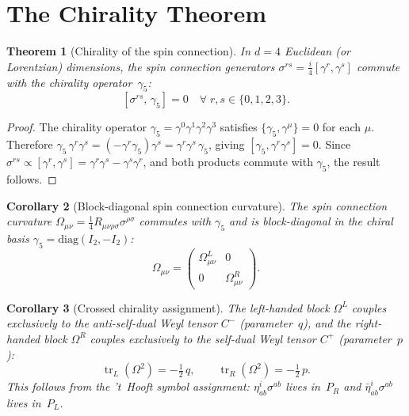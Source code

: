 \documentclass[12pt,a4paper]{article}
\newcommand{\tr}{\operatorname{tr}}
\newcommand{\half}{\tfrac{1}{2}}
\newtheorem{theorem}{Theorem}[section]
\newtheorem{corollary}[theorem]{Corollary}
\begin{document}
\section{The Chirality Theorem}
\label{sec:chirality}

\begin{theorem}[Chirality of the spin connection]
In $d = 4$ Euclidean (or Lorentzian) dimensions, the spin connection generators
$\sigma^{rs} = \frac{i}{4}[\gamma^r, \gamma^s]$ commute with the chirality
operator~$\gamma_5$:
\begin{equation}\label{eq:sigma-g5}
  [\sigma^{rs},\, \gamma_5] = 0 \quad \forall\; r, s \in \{0,1,2,3\}.
\end{equation}
\end{theorem}

\begin{proof}
The chirality operator $\gamma_5 = \gamma^0\gamma^1\gamma^2\gamma^3$ satisfies
$\{\gamma_5, \gamma^\mu\} = 0$ for each $\mu$.  Therefore
$\gamma_5\, \gamma^r\gamma^s = (-\gamma^r\gamma_5)\gamma^s
= \gamma^r\gamma^s\,\gamma_5$, giving
$[\gamma_5, \gamma^r\gamma^s] = 0$.  Since
$\sigma^{rs} \propto [\gamma^r, \gamma^s] = \gamma^r\gamma^s - \gamma^s\gamma^r$,
and both products commute with $\gamma_5$, the result follows.
\end{proof}

\begin{corollary}[Block-diagonal spin connection curvature]
The spin connection curvature
$\Omega_{\mu\nu} = \frac{1}{4}R_{\mu\nu\rho\sigma}\sigma^{\rho\sigma}$
commutes with $\gamma_5$ and is block-diagonal in the chiral basis
$\gamma_5 = \mathrm{diag}(I_2, -I_2)$:
\begin{equation}
  \Omega_{\mu\nu} = \begin{pmatrix} \Omega^L_{\mu\nu} & 0 \\ 0 & \Omega^R_{\mu\nu} \end{pmatrix}.
\end{equation}
\end{corollary}

\begin{corollary}[Crossed chirality assignment]
\label{cor:crossed}
The left-handed block $\Omega^L$ couples exclusively to the anti-self-dual
Weyl tensor $C^-$ (parameter~$q$), and the right-handed block $\Omega^R$
couples exclusively to the self-dual Weyl tensor $C^+$ (parameter~$p$):
\begin{equation}
  \tr_L(\Omega^2) = -\half\, q, \qquad
  \tr_R(\Omega^2) = -\half\, p.
\end{equation}
This follows from the 't~Hooft symbol assignment:
$\eta^i_{ab}\sigma^{ab}$ lives in~$P_R$ and
$\bar\eta^i_{ab}\sigma^{ab}$ lives in~$P_L$.
\end{corollary}
\end{document}
